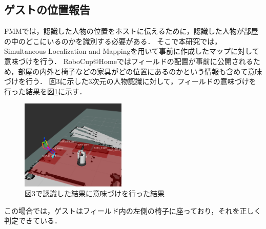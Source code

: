 \documentclass[a4j]{jarticle}
\begin{document}
\subsection{ゲストの位置報告}
FMMでは，認識した人物の位置をホストに伝えるために，認識した人物が部屋の中のどこにいるのかを識別する必要がある．
そこで本研究では，Simultaneous Localization and Mappingを用いて事前に作成したマップに対して意味づけを行う．
RoboCup@Homeではフィールドの配置が事前に公開されるため，部屋の内外と椅子などの家具がどの位置にあるのかという情報も含めて意味づけを行う．
図3に示した3次元の人物認識に対して，フィールドの意味づけを行った結果を図\ref{human_where_map}に示す．
\begin{figure}[t]
  \centering
  \includegraphics[width=5cm]{images/human_recognition/ss_5_trim.png}
  \caption{図3で認識した結果に意味づけを行った結果}
  \label{human_where_map}
\end{figure}
この場合では，ゲストはフィールド内の左側の椅子に座っており，それを正しく判定できている．


\end{document}
